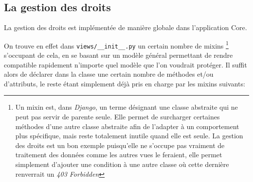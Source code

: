 \documentclass[a4paper]{report}
\begin{document}
\subsection{La gestion des droits}
\label{sub:la_gestion_des_droits}
\par La gestion des droits est implémentée de manière globale dans l'application Core.
\par On trouve en effet dans \verb#views/__init__.py# un certain nombre de mixins \footnote{Un mixin est, dans
\emph{Django}, un terme désignant une classe abstraite qui ne peut pas servir de parente seule. Elle permet de
surcharger certaines méthodes d'une autre classe abstraite afin de l'adapter à un comportement plus spécifique, mais
reste totalement inutile quand elle est seule. La gestion des droits est un bon exemple puisqu'elle ne s'occupe pas
vraiment de traitement des données comme les autres vues le feraient, elle permet simplement d'ajouter une condition à une
autre classe où cette dernière renverrait un \emph{403 Forbidden} }  s'occupant de cela, en se basant sur
un modèle général permettant de rendre compatible rapidement n'importe quel modèle que l'on voudrait protéger. Il suffit
alors de déclarer dans la classe une certain nombre de méthodes et/ou d'attributs, le reste étant simplement déjà pris
en charge par les mixins suivants:
\end{document}
